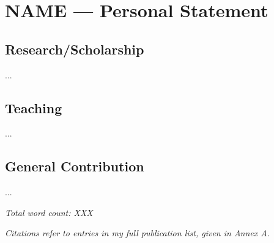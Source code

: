 


\section{NAME --- Personal Statement}

\subsection{Research/Scholarship}

...

\subsection{Teaching}

...

\subsection{General Contribution}

...

\hfill\emph{Total word count: XXX}

{\it Citations refer to entries in my full publication list, given in Annex A.}

